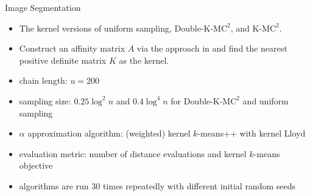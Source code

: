 \documentclass{beamer}
\begin{document}
\begin{frame}{Image Segmentation}
	\begin{center}
	\end{center}
	\begin{itemize}
		\scriptsize
		\item The kernel versions of uniform sampling, Double-K-M$\text{C}^2$, and K-M$\text{C}^2$.
		\item Construct an affinity matrix $A$ via the approach in \citet{stella2003multiclass} and find the nearest positive definite matrix $K$ as the kernel.
		\item chain length: $u=200$
		\item sampling size: $0.25\log^2 n$ and $0.4\log^4 n$ for Double-K-M$\text{C}^2$ and uniform sampling
		\item $\alpha$ approximation algorithm: (weighted) kernel $k$-means++ with kernel Lloyd
		\item evaluation metric: number of distance evaluations and kernel $k$-means objective
		\item algorithms are run 30 times repeatedly with different initial random seeds
	\end{itemize}
\end{frame}
\end{document}
